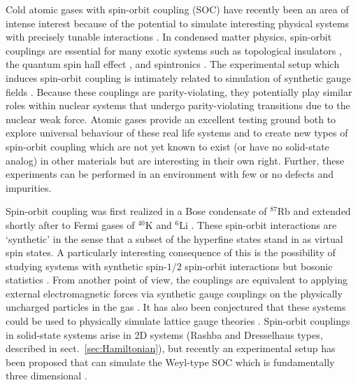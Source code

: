 \documentclass[%
 notitlepage,
 preprint,
showpacs,%
 amsmath,amssymb,
 aps,
pra,
]{revtex4-1}
\begin{document}
Cold atomic gases with spin-orbit coupling (SOC) have recently been an area of intense interest because of the potential to simulate interesting physical systems with precisely tunable interactions \cite{nature11841}. In condensed matter physics, spin-orbit couplings are essential for many exotic systems such as topological insulators \cite{das2013engineering,PhysRevLett.105.255302}, the quantum spin hall effect \cite{nature12185}, and spintronics \cite{RevModPhys.76.323}. The experimental setup which induces spin-orbit coupling is intimately related to simulation of synthetic gauge fields \cite{RevModPhys.83.1523,hamner2014dicke,Lin:2009zzb,Bermudez:2011db}. Because these couplings are parity-violating, they potentially play similar roles within nuclear systems that undergo parity-violating transitions due to the nuclear weak force.  Atomic gases provide an excellent testing ground both to explore universal behaviour of these real life systems and to create new types of spin-orbit coupling which are not yet known to exist (or have no solid-state analog) in other materials but are interesting in their own right. Further, these experiments can be performed in an environment with few or no defects and impurities.

Spin-orbit coupling was first realized in a Bose condensate of $^{87}$Rb \cite{nature09887} and extended shortly after to Fermi gases of $^{40}$K \cite{PhysRevLett.109.095301} and $^6$Li \cite{PhysRevLett.109.095302}. These spin-orbit interactions are `synthetic' in the sense that a subset of the hyperfine states stand in as virtual spin states. A particularly interesting consequence of this is the possibility of studying systems with synthetic spin-$1/2$ spin-orbit interactions but bosonic statistics \cite{PhysRevA.68.063612,nature09887}. From another point of view, the couplings are equivalent to applying external electromagnetic forces via synthetic gauge couplings on the physically uncharged particles in the gas \cite{Lin:2011,PhysRevLett.107.255301}. It has also been conjectured that these systems could be used to physically simulate lattice gauge theories \cite{Bermudez:2010da,Mazza:2011kf}.  Spin-orbit couplings in solid-state systems arise in 2D systems (Rashba and Dresselhaus types, described in sect.~\ref{sec:Hamiltonian}), but recently an experimental setup has been proposed that can simulate the Weyl-type SOC which is fundamentally three dimensional \cite{PhysRevLett.108.235301}.
\end{document}

